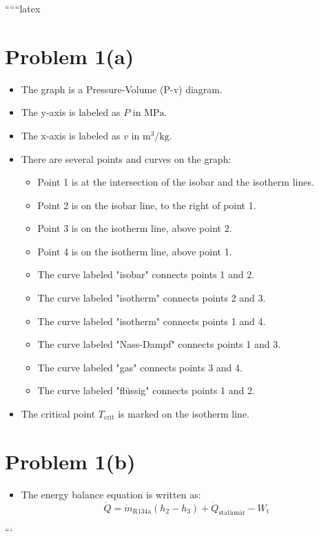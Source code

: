 
``````latex


\section*{Problem 1(a)}

\begin{itemize}
    \item The graph is a Pressure-Volume (P-v) diagram.
    \item The y-axis is labeled as \( P \) in \( \text{MPa} \).
    \item The x-axis is labeled as \( v \) in \( \text{m}^3/\text{kg} \).
    \item There are several points and curves on the graph:
        \begin{itemize}
            \item Point 1 is at the intersection of the isobar and the isotherm lines.
            \item Point 2 is on the isobar line, to the right of point 1.
            \item Point 3 is on the isotherm line, above point 2.
            \item Point 4 is on the isotherm line, above point 1.
            \item The curve labeled "isobar" connects points 1 and 2.
            \item The curve labeled "isotherm" connects points 2 and 3.
            \item The curve labeled "isotherm" connects points 1 and 4.
            \item The curve labeled "Nass-Dampf" connects points 1 and 3.
            \item The curve labeled "gas" connects points 3 and 4.
            \item The curve labeled "flüssig" connects points 1 and 2.
        \end{itemize}
    \item The critical point \( T_{\text{crit}} \) is marked on the isotherm line.
\end{itemize}

\section*{Problem 1(b)}

\begin{itemize}
    \item The energy balance equation is written as:
    \[
    \dot{Q} = \dot{m}_{\text{R134a}} \left( h_2 - h_3 \right) + \dot{Q}_{\text{stationär}} - W_{\text{t}}
    \]
\end{itemize}

```